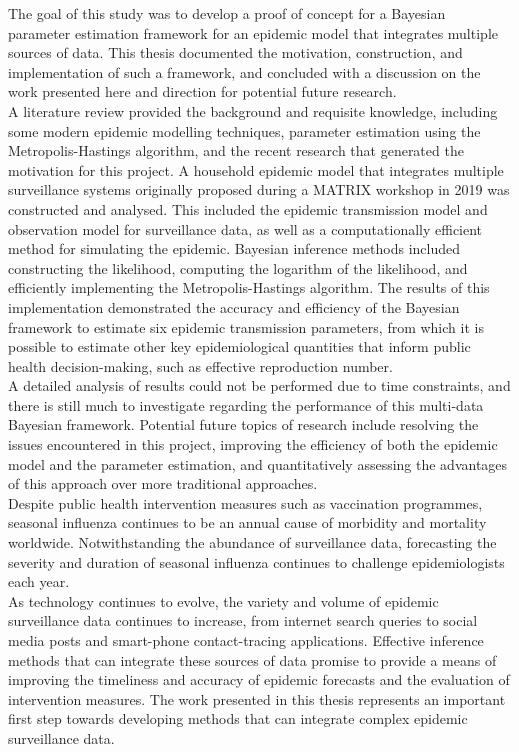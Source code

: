 
The goal of this study was to develop a proof of concept for a Bayesian parameter estimation framework for an epidemic model that integrates multiple sources of data. This thesis documented the motivation, construction, and implementation of such a framework, and concluded with a discussion on the work presented here and direction for potential future research. \\
A literature review provided the background and requisite knowledge, including some modern epidemic modelling techniques, parameter estimation using the Metropolis-Hastings algorithm, and the recent research that generated the motivation for this project. A household epidemic model that integrates multiple surveillance systems originally proposed during a MATRIX workshop in 2019 was constructed and analysed. This included the epidemic transmission model and observation model for surveillance data, as well as a computationally efficient method for simulating the epidemic. Bayesian inference methods included constructing the likelihood, computing the logarithm of the likelihood, and efficiently implementing the Metropolis-Hastings algorithm. The results of this implementation demonstrated the accuracy and efficiency of the Bayesian framework to estimate six epidemic transmission parameters, from which it is possible to estimate other key epidemiological quantities that inform public health decision-making, such as effective reproduction number.\\
A detailed analysis of results could not be performed due to time constraints, and there is still much to investigate regarding the performance of this multi-data Bayesian framework. Potential future topics of research include resolving the issues encountered in this project, improving the efficiency of both the epidemic model and the parameter estimation, and quantitatively assessing the advantages of this approach over more traditional approaches.\\
Despite public health intervention measures such as vaccination programmes, seasonal influenza continues to be an annual cause of morbidity and mortality worldwide. Notwithstanding the abundance of surveillance data, forecasting the severity and duration of seasonal influenza continues to challenge epidemiologists each year.\\
As technology continues to evolve, the variety and volume of epidemic surveillance data continues to increase, from internet search queries to social media posts and smart-phone contact-tracing applications. Effective inference methods that can integrate these sources of data promise to provide a means of improving the timeliness and accuracy of epidemic forecasts and the evaluation of intervention measures. The work presented in this thesis represents an important first step towards developing methods that can integrate complex epidemic surveillance data.
